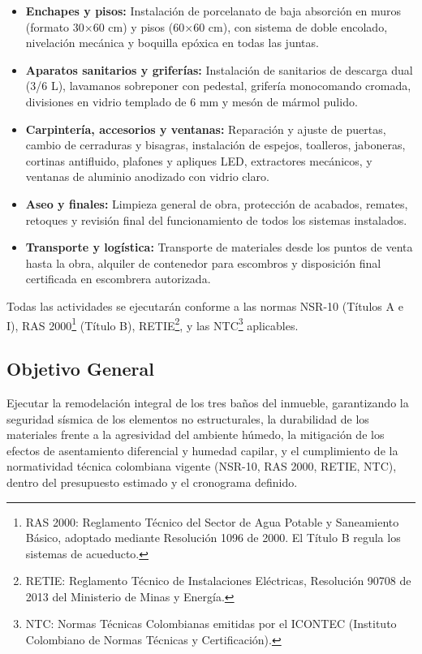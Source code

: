﻿\documentclass[12pt]{article}
\begin{document}
\begin{itemize}[noitemsep]
  \item {\bfseries Enchapes y pisos:} Instalación de porcelanato de baja absorción en muros (formato 30$\times$60 cm) y pisos (60$\times$60 cm), con sistema de doble encolado, nivelación mecánica y boquilla epóxica en todas las juntas.

  \item {\bfseries Aparatos sanitarios y griferías:} Instalación de sanitarios de descarga dual (3/6 L), lavamanos sobreponer con pedestal, grifería monocomando cromada, divisiones en vidrio templado de 6 mm y mesón de mármol pulido.

  \item {\bfseries Carpintería, accesorios y ventanas:} Reparación y ajuste de puertas, cambio de cerraduras y bisagras, instalación de espejos, toalleros, jaboneras, cortinas antifluido, plafones y apliques LED, extractores mecánicos, y ventanas de aluminio anodizado con vidrio claro.

  \item {\bfseries Aseo y finales:} Limpieza general de obra, protección de acabados, remates, retoques y revisión final del funcionamiento de todos los sistemas instalados.

  \item {\bfseries Transporte y logística:} Transporte de materiales desde los puntos de venta hasta la obra, alquiler de contenedor para escombros y disposición final certificada en escombrera autorizada.
\end{itemize}

Todas las actividades se ejecutarán conforme a las normas NSR-10 (Títulos A e I), RAS 2000\footnote{RAS 2000: Reglamento Técnico del Sector de Agua Potable y Saneamiento Básico, adoptado mediante Resolución 1096 de 2000. El Título B regula los sistemas de acueducto.} (Título B), RETIE\footnote{RETIE: Reglamento Técnico de Instalaciones Eléctricas, Resolución 90708 de 2013 del Ministerio de Minas y Energía.}, y las NTC\footnote{NTC: Normas Técnicas Colombianas emitidas por el ICONTEC (Instituto Colombiano de Normas Técnicas y Certificación).} aplicables.

\subsection{Objetivo General}

Ejecutar la remodelación integral de los tres baños del inmueble, garantizando la
seguridad sísmica de los elementos no estructurales, la durabilidad de los materiales
frente a la agresividad del ambiente húmedo, la mitigación de los efectos de
asentamiento diferencial y humedad capilar, y el cumplimiento de la normatividad
técnica colombiana vigente (NSR-10, RAS 2000, RETIE, NTC), dentro del presupuesto
estimado y el cronograma definido.
\end{document}
